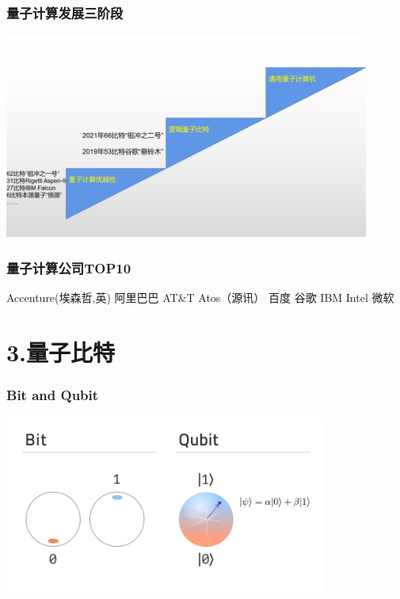 \begin{frame} 
    \frametitle{量子计算发展三阶段}
    \begin{center}
        \includegraphics[width=0.9\textwidth]{figs/6.png}
    \end{center} 
\end{frame}

\begin{frame} 
    \frametitle{量子计算公司TOP10}
    \begin{enumerate}
        \Item   Accenture(埃森哲,英)
        \Item   阿里巴巴
        \Item   AT\&T
        \Item   Atos（源讯）
        \Item   百度
        \Item   谷歌
        \Item   IBM
        \Item   Intel
        \Item   微软
    \end{enumerate}
\end{frame}

\section{3.量子比特}

\begin{frame} 
    \frametitle{Bit and Qubit}
    \begin{center}
        \includegraphics[width=0.8\textwidth]{figs/7.png}
    \end{center} 
\end{frame}

